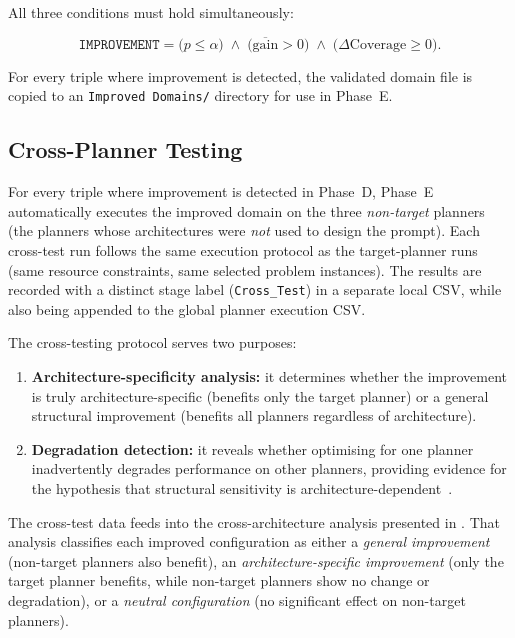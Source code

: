 \noindent All three conditions must hold simultaneously:

\begin{equation}\label{eq:improvement}
  \texttt{IMPROVEMENT} = \bigl(p \leq \alpha\bigr) \;\wedge\; \bigl(\overline{\text{gain}} > 0\bigr) \;\wedge\; \bigl(\Delta\text{Coverage} \geq 0\bigr).
\end{equation}

For every triple where improvement is detected, the validated domain file is copied to an \texttt{Improved Domains/} directory for use in Phase~E.

\subsection{Cross-Planner Testing}
\label{sec:design:stage2:cross_test}

For every triple where improvement is detected in Phase~D, Phase~E automatically executes the improved domain on the three \emph{non-target} planners (the planners whose architectures were \emph{not} used to design the prompt).
Each cross-test run follows the same execution protocol as the target-planner runs (same resource constraints, same selected problem instances).
The results are recorded with a distinct stage label (\texttt{Cross\_Test}) in a separate local CSV, while also being appended to the global planner execution CSV.

The cross-testing protocol serves two purposes:

\begin{enumerate}
  \item \textbf{Architecture-specificity analysis:} it determines whether the improvement is truly architecture-specific (benefits only the target planner) or a general structural improvement (benefits all planners regardless of architecture).
  \item \textbf{Degradation detection:} it reveals whether optimising for one planner inadvertently degrades performance on other planners, providing evidence for the hypothesis that structural sensitivity is architecture-dependent~\cite{Vallati2021}.
\end{enumerate}

The cross-test data feeds into the cross-architecture analysis presented in . That analysis classifies each improved configuration as either a \emph{general improvement} (non-target planners also benefit), an \emph{architecture-specific improvement} (only the target planner benefits, while non-target planners show no change or degradation), or a \emph{neutral configuration} (no significant effect on non-target planners).

